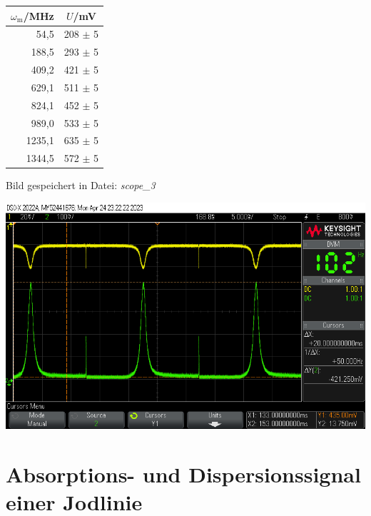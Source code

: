 \begin{center}
    \captionsetup{type=table}
    \begin{tabular}{r | c }
        $\omega_\mathrm{m}$/MHz & $U$/mV \\ \hline
        54,5   & 208 $\pm$ 5 \\
        188,5  & 293 $\pm$ 5 \\
        409,2  & 421 $\pm$ 5 \\
        629,1  & 511 $\pm$ 5 \\
        824,1  & 452 $\pm$ 5 \\
        989,0  & 533 $\pm$ 5 \\
        1235,1 & 635 $\pm$ 5 \\
        1344,5 & 572 $\pm$ 5 \\
    \end{tabular}
    \label{tab:verluste}
\end{center}

Bild gespeichert in Datei: \textit{scope\_3}

\begin{center}
    \captionsetup{type=figure}
    \includegraphics[scale=0.3]{Bilder/Signal-Rausch/scope_3.png}
    \label{fig:verluste}
\end{center}

\newpage

\section{Absorptions- und Dispersionssignal einer Jodlinie}
\label{sub:jodline}

